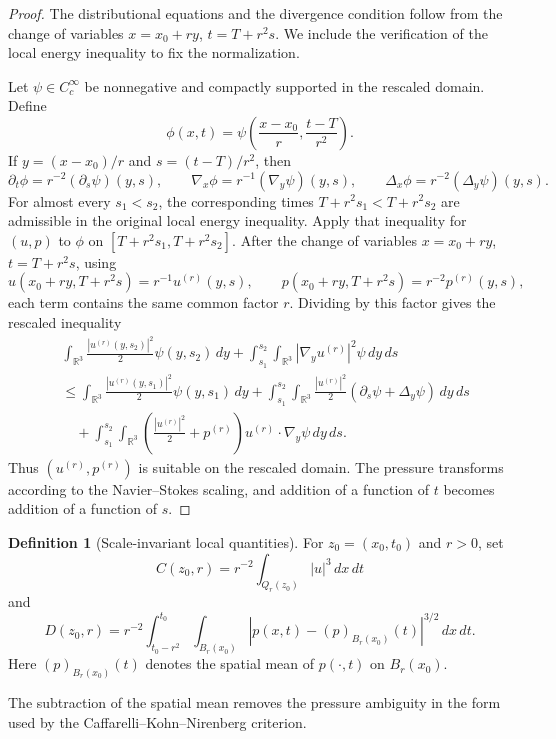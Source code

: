 \documentclass[11pt]{amsart}
\theoremstyle{plain}
\theoremstyle{definition}
\newtheorem{definition}[definition]{Definition}
\theoremstyle{remark}
\begin{document}
\begin{proof}
The distributional equations and the divergence condition follow from the
change of variables \(x=x_0+ry\), \(t=T+r^2s\).  We include the verification of
the local energy inequality to fix the normalization.

Let \(\psi\in C_c^\infty\) be nonnegative and compactly supported in the
rescaled domain.  Define
\[
  \phi(x,t)=
  \psi\left(\frac{x-x_0}{r},\frac{t-T}{r^2}\right).
\]
If \(y=(x-x_0)/r\) and \(s=(t-T)/r^2\), then
\[
  \partial_t\phi=r^{-2}(\partial_s\psi)(y,s),\qquad
  \nabla_x\phi=r^{-1}(\nabla_y\psi)(y,s),\qquad
  \Delta_x\phi=r^{-2}(\Delta_y\psi)(y,s).
\]
For almost every \(s_1<s_2\), the corresponding times
\(T+r^2s_1<T+r^2s_2\) are admissible in the original local energy inequality.
Apply that inequality for \((u,p)\) to \(\phi\) on
\([T+r^2s_1,T+r^2s_2]\).  After the change of variables
\(x=x_0+ry\), \(t=T+r^2s\), using
\[
  u(x_0+ry,T+r^2s)=r^{-1}u^{(r)}(y,s),\qquad
  p(x_0+ry,T+r^2s)=r^{-2}p^{(r)}(y,s),
\]
each term contains the same common factor \(r\).  Dividing by this factor gives
the rescaled inequality
\[
\begin{aligned}
&\int_{\mathbb R^3}\frac{|u^{(r)}(y,s_2)|^2}{2}\psi(y,s_2)\,dy
 +\int_{s_1}^{s_2}\int_{\mathbb R^3}|\nabla_y u^{(r)}|^2\psi\,dy\,ds \\
&\le
 \int_{\mathbb R^3}\frac{|u^{(r)}(y,s_1)|^2}{2}\psi(y,s_1)\,dy
 +\int_{s_1}^{s_2}\int_{\mathbb R^3}
   \frac{|u^{(r)}|^2}{2}(\partial_s\psi+\Delta_y\psi)\,dy\,ds \\
&\quad
 +\int_{s_1}^{s_2}\int_{\mathbb R^3}
   \left(\frac{|u^{(r)}|^2}{2}+p^{(r)}\right)
   u^{(r)}\cdot\nabla_y\psi\,dy\,ds .
\end{aligned}
\]
Thus \((u^{(r)},p^{(r)})\) is suitable on the rescaled domain.  The pressure
transforms according to the Navier--Stokes scaling, and addition of a function
of \(t\) becomes addition of a function of \(s\).
\end{proof}

\begin{definition}[Scale-invariant local quantities]
For \(z_0=(x_0,t_0)\) and \(r>0\), set
\[
  C(z_0,r)=r^{-2}\int_{Q_r(z_0)} |u|^3\,dx\,dt
\]
and
\[
  D(z_0,r)=r^{-2}
  \int_{t_0-r^2}^{t_0}\int_{B_r(x_0)}
  |p(x,t)-(p)_{B_r(x_0)}(t)|^{3/2}\,dx\,dt.
\]
Here \((p)_{B_r(x_0)}(t)\) denotes the spatial mean of \(p(\cdot,t)\) on
\(B_r(x_0)\).
\end{definition}

The subtraction of the spatial mean removes the pressure ambiguity in the form
used by the Caffarelli--Kohn--Nirenberg criterion.
\end{document}
